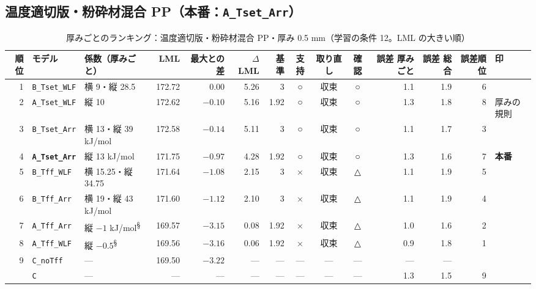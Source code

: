 \documentclass[paper=a4paper,landscape,fontsize=10pt,line_length=62zw,number_of_lines=34]{jlreq}
\let\origtextbf\textbf
\renewcommand{\textbf}[1]{\origtextbf{\gtfamily #1}}   %
\begin{document}
\subsection{温度適切版・粉砕材混合 PP（本番：\texttt{A\_\allowbreak{}Tset\_\allowbreak{}Arr}）}
\begin{table}[H]\centering\footnotesize
\caption{厚みごとのランキング：温度適切版・粉砕材混合 PP・厚み 0.5 mm（学習の条件 12。LML の大きい順）}
\begin{tabular}{rlp{11\zw}rrrrccc rrrl}
\toprule
順位 & モデル & 係数（厚みごと） & LML & 最大との差 & $\Delta$LML & 基準 & 支持 & 取り直し & 確認 & 誤差 厚みごと & 誤差 総合 & 誤差順位 & 印 \\
\midrule
1 & \texttt{B\_\allowbreak{}Tset\_\allowbreak{}WLF} & 横 9・縦 28.5 & 172.72 & 0.00 & 5.26 & 3 & ○ & 収束 & ○ & 1.1 & 1.9 & 6 &  \\
2 & \texttt{A\_\allowbreak{}Tset\_\allowbreak{}WLF} & 縦 10 & 172.62 & $-0.10$ & 5.16 & 1.92 & ○ & 収束 & ○ & 1.3 & 1.8 & 8 & 厚みの規則 \\
3 & \texttt{B\_\allowbreak{}Tset\_\allowbreak{}Arr} & 横 13・縦 39 kJ/mol & 172.58 & $-0.14$ & 5.11 & 3 & ○ & 収束 & ○ & 1.1 & 1.7 & 3 &  \\
4 & \textbf{\texttt{A\_\allowbreak{}Tset\_\allowbreak{}Arr}} & 縦 13 kJ/mol & 171.75 & $-0.97$ & 4.28 & 1.92 & ○ & 収束 & ○ & 1.3 & 1.6 & 7 & \textbf{本番} \\
5 & \texttt{B\_\allowbreak{}Tff\_\allowbreak{}WLF} & 横 15.25・縦 34.75 & 171.64 & $-1.08$ & 2.15 & 3 & × & 収束 & △ & 1.1 & 1.9 & 5 &  \\
6 & \texttt{B\_\allowbreak{}Tff\_\allowbreak{}Arr} & 横 19・縦 43 kJ/mol & 171.60 & $-1.12$ & 2.10 & 3 & × & 収束 & △ & 1.1 & 1.9 & 4 &  \\
7 & \texttt{A\_\allowbreak{}Tff\_\allowbreak{}Arr} & 縦 $-1$ kJ/mol\textsuperscript{§} & 169.57 & $-3.15$ & 0.08 & 1.92 & × & 収束 & △ & 1.0 & 1.6 & 2 &  \\
8 & \texttt{A\_\allowbreak{}Tff\_\allowbreak{}WLF} & 縦 $-0.5$\textsuperscript{§} & 169.56 & $-3.16$ & 0.06 & 1.92 & × & 収束 & △ & 0.9 & 1.8 & 1 &  \\
9 & \texttt{C\_\allowbreak{}noTff} & --- & 169.50 & $-3.22$ & --- & --- & --- & --- & --- & --- & --- &  &  \\
 & \texttt{C} & --- & --- & --- & --- & --- & --- & --- & --- & 1.3 & 1.5 & 9 &  \\
\bottomrule
\end{tabular}
\end{table}
\end{document}
